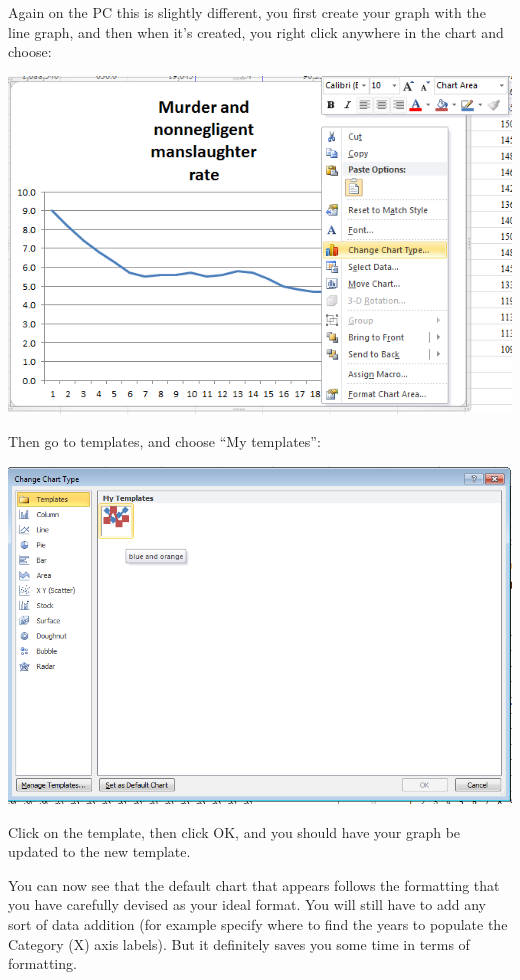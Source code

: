\documentclass[
]{book}
\begin{document}
Again on the PC this is slightly different, you first create your graph with the line graph, and then when it's created, you right click anywhere in the chart and choose:

\includegraphics{imgs/pc_apply_template.png}

Then go to templates, and choose ``My templates'':

\includegraphics{imgs/pc_my_templates.png}

Click on the template, then click OK, and you should have your graph be updated to the new template.

You can now see that the default chart that appears follows the formatting that you have carefully devised as your ideal format. You will still have to add any sort of data addition (for example specify where to find the years to populate the Category (X) axis labels). But it definitely saves you some time in terms of formatting.
\end{document}

